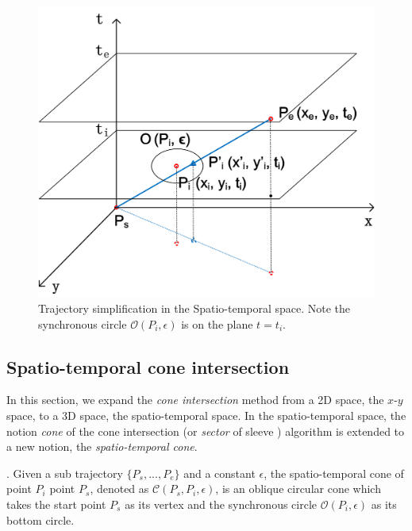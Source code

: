 \begin{figure}[tb!]
\centering
\includegraphics[scale=0.6]{figures/Fig-SEDin3D.png}
\vspace{-1ex}
\caption{\small Trajectory simplification in the Spatio-temporal space. Note the synchronous circle $\mathcal{O}(P_i, \epsilon)$ is on the plane $t=t_i$.}
\vspace{-3ex}
\label{fig:sed3d}
\end{figure}




\subsection{Spatio-temporal cone intersection}

In this section, we expand the \emph{cone intersection} method from a 2D space, \ie the $x$-$y$ space, to a 3D space, \ie the spatio-temporal space.
In the spatio-temporal space, the notion \emph{cone} of the cone intersection \cite{Williams:Longest, Sklansky:Cone} (or \emph{sector} of sleeve \cite{Zhao:Sleeve}) algorithm is extended to a new notion, \ie the \emph{spatio-temporal cone}.

. Given a sub trajectory $\{P_s,...,P_e\}$ and a constant $\epsilon$, the spatio-temporal cone of point $P_i$ \wrt point $P_s$, denoted as $\mathcal{C}(P_s, P_i, \epsilon)$, is an oblique circular cone which takes the start point $P_s$ as its vertex and the synchronous circle $\mathcal{O}(P_i, \epsilon)$ as its bottom circle.

